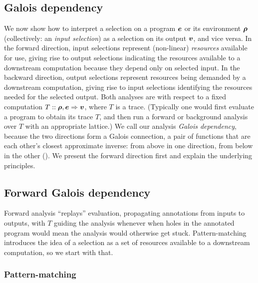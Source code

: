 \subsection{Galois dependency}
\label{sec:data-dependencies:analyses}

We now show how to interpret a selection on a program $\bm{e}$ or its environment $\bm{\rho}$ (collectively: an \emph{input selection}) as a selection on its output $\bm{v}$, and vice versa. In the forward direction, input selections represent (non-linear) \emph{resources} available for use, giving rise to output selections indicating the resources available to a downstream computation because they depend only on selected input. In the backward direction, output selections represent resources being demanded by a downstream computation, giving rise to input selections identifying the resources needed for the selected output. Both analyses are with respect to a fixed computation $T :: \bm{\rho}, \bm{e} \Rightarrow \bm{v}$, where $T$ is a trace. (Typically one would first evaluate a program to obtain its trace $T$, and then run a forward or background analysis over $T$ with an appropriate lattice.) We call our analysis \emph{Galois dependency}, because the two directions form a Galois connection, a pair of functions that are each other's closest approximate inverse: from above in one direction, from below in the other ().  We present the forward direction first and explain the underlying principles.

\subsection{Forward Galois dependency}
\label{sec:data-dependencies:analyses:fwd}

Forward analysis ``replays'' evaluation, propagating annotations from inputs to outputs, with $T$ guiding the analysis whenever when holes in the annotated program would mean the analysis would otherwise get stuck. Pattern-matching introduces the idea of a selection as a set of resources available to a downstream computation, so we start with that.



\subsubsection{Pattern-matching}
\label{sec:data-dependencies:analyses:fwd:pattern-match}

